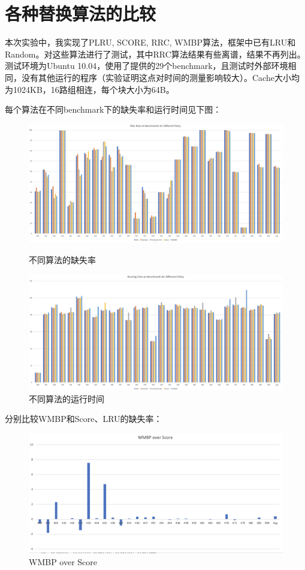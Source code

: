 \documentclass[utf8]{article}
\begin{document}
\section{各种替换算法的比较}
本次实验中，我实现了PLRU, SCORE, RRC, WMBP算法，框架中已有LRU和Random。对这些算法进行了测试，其中RRC算法结果有些离谱，结果不再列出。测试环境为Ubuntu 10.04，使用了提供的29个benchmark，且测试时外部环境相同，没有其他运行的程序（实验证明这点对时间的测量影响较大）。Cache大小均为1024KB，16路组相连，每个块大小为64B。

每个算法在不同benchmark下的缺失率和运行时间见下图：
\begin{figure}[H]
	\centering
	\includegraphics[scale=0.3]{./photos/mr.png}
    \label{Fig2}
    \caption{不同算法的缺失率}
\end{figure}

\begin{figure}[H]
	\centering
    \includegraphics[scale=0.3]{./photos/time.png}
    \caption{不同算法的运行时间}
	\label{Fig3}
\end{figure}

分别比较WMBP和Score、LRU的缺失率：
\begin{figure}[H]
	\centering
    \includegraphics[scale=0.5]{./photos/score.png}
    \caption{WMBP over Score}
	\label{Fig3}
\end{figure}
\end{document}
